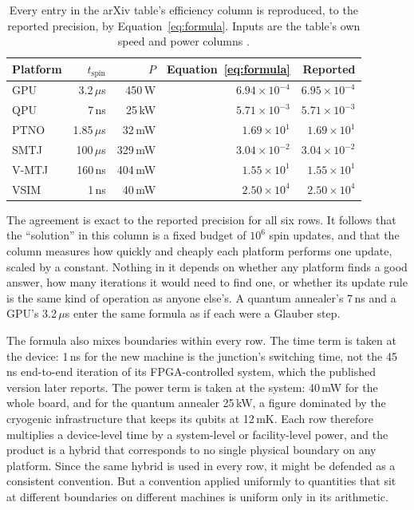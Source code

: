 \documentclass[11pt]{article}
\theoremstyle{definition}
\theoremstyle{remark}
\begin{document}
\begin{table}[h]
\centering
\small
\begin{tabular}{lrrrr}
\toprule
Platform & $t_{\mathrm{spin}}$ & $P$ & Equation~\eqref{eq:formula} & Reported \\
\midrule
GPU & 3.2\,$\mu$s & 450\,W & $6.94 \times 10^{-4}$ & $6.95 \times 10^{-4}$ \\
QPU & 7\,ns & 25\,kW & $5.71 \times 10^{-3}$ & $5.71 \times 10^{-3}$ \\
PTNO & 1.85\,$\mu$s & 32\,mW & $1.69 \times 10^{1}$ & $1.69 \times 10^{1}$ \\
SMTJ & 100\,$\mu$s & 329\,mW & $3.04 \times 10^{-2}$ & $3.04 \times 10^{-2}$ \\
V-MTJ & 160\,ns & 404\,mW & $1.55 \times 10^{1}$ & $1.55 \times 10^{1}$ \\
VSIM & 1\,ns & 40\,mW & $2.50 \times 10^{4}$ & $2.50 \times 10^{4}$ \\
\bottomrule
\end{tabular}
\caption{Every entry in the arXiv table's efficiency column is reproduced, to the reported precision, by Equation~\eqref{eq:formula}. Inputs are the table's own speed and power columns \cite{li2025arxiv}.}
\label{tab:reconstruct}
\end{table}

The agreement is exact to the reported precision for all six rows. It follows that the ``solution'' in this column is a fixed budget of $10^6$ spin updates, and that the column measures how quickly and cheaply each platform performs one update, scaled by a constant. Nothing in it depends on whether any platform finds a good answer, how many iterations it would need to find one, or whether its update rule is the same kind of operation as anyone else's. A quantum annealer's 7\,ns and a GPU's 3.2\,$\mu$s enter the same formula as if each were a Glauber step.

The formula also mixes boundaries within every row. The time term is taken at the device: 1\,ns for the new machine is the junction's switching time, not the 45\,ns end-to-end iteration of its FPGA-controlled system, which the published version later reports. The power term is taken at the system: 40\,mW for the whole board, and for the quantum annealer 25\,kW, a figure dominated by the cryogenic infrastructure that keeps its qubits at 12\,mK. Each row therefore multiplies a device-level time by a system-level or facility-level power, and the product is a hybrid that corresponds to no single physical boundary on any platform. Since the same hybrid is used in every row, it might be defended as a consistent convention. But a convention applied uniformly to quantities that sit at different boundaries on different machines is uniform only in its arithmetic.
\end{document}

